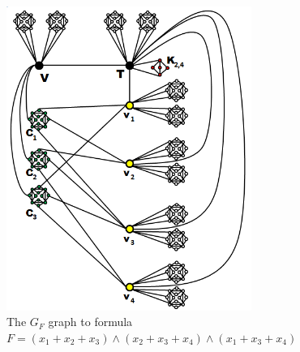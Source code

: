 \begin{figure}[htb]	
\center%
\includegraphics[width=8cm]{./img/exemploGrafoGFSBPO3.png}
\caption{The $G_{F}$ graph to formula $F=(x_1+ x_2+ x_3) \wedge  (x_2+ x_3+ x_4 )\wedge  (x_1 + x_3+ x_4 )$}
\label{fig:exemploGrafoGF}
\end{figure}
